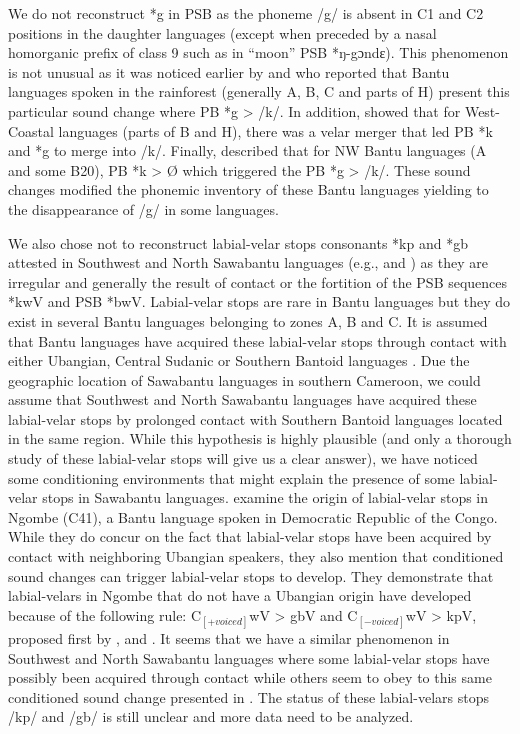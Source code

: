 \documentclass[output=paper,colorlinks,citecolor=brown
]{langscibook}
\begin{document}
We do not reconstruct *g in PSB as the phoneme /g/ is absent in C1 and C2 positions in the daughter languages (except when preceded by a nasal homorganic prefix of class 9 such as in “moon” PSB *ŋ-gɔndɛ). This phenomenon is not unusual as it was noticed earlier by \citet{mohlig1981} and \citet{nurseandphilippson2003} who reported that Bantu languages spoken in the rainforest (generally A, B, C and parts of H) present this particular sound change where PB *g > /k/. In addition, \citet{pacchiarottiandbostoen2020} showed that for West-Coastal languages (parts of B and H), there was a velar merger that led PB *k and *g to merge into /k/. Finally, \citet{grollemundandphilippsonforth2} described that for NW Bantu languages (A and some B20), PB *k > Ø which triggered the PB *g > /k/. These sound changes modified the phonemic inventory of these Bantu languages yielding to the disappearance of /g/ in some languages. 

We also chose not to reconstruct labial-velar stops consonants *kp and *gb attested in Southwest and North Sawabantu languages (e.g.,  and ) as they are irregular and generally the result of contact or the fortition of the PSB sequences *kwV and PSB *bwV. Labial-velar stops are rare in Bantu languages but they do exist in several Bantu languages belonging to zones A, B and C. It is assumed that Bantu languages have acquired these labial-velar stops through contact with either Ubangian, Central Sudanic or Southern Bantoid languages \citep{clementsandrialland2008, bostoenanddonzo2013, idiatovandvandevelde2021}. Due the geographic location of Sawabantu languages in southern Cameroon, we could assume that Southwest and North Sawabantu languages have acquired these labial-velar stops by prolonged contact with Southern Bantoid languages located in the same region. While this hypothesis is highly plausible (and only a thorough study of these labial-velar stops will give us a clear answer), we have noticed some conditioning environments that might explain the presence of some labial-velar stops in Sawabantu languages. \citet[450]{bostoenanddonzo2013} examine the origin of labial-velar stops in Ngombe (C41), a Bantu language spoken in Democratic Republic of the Congo. While they do concur on the fact that labial-velar stops have been acquired by contact with neighboring Ubangian speakers, they also mention that conditioned sound changes can trigger labial-velar stops to develop. They demonstrate that labial-velars in Ngombe that do not have a Ubangian origin have developed because of the following rule: C$_{[+voiced]}$wV > gbV and C$_{[-voiced]}$wV > kpV, proposed first by \citet{Connell1994}, \citet{Connell1998} and \citet{cahill1999}. It seems that we have a similar phenomenon in Southwest and North Sawabantu languages where some labial-velar stops have possibly been acquired through contact while others seem to obey to this same conditioned sound change presented in . The status of these labial-velars stops /kp/ and /gb/ is still unclear and more data need to be analyzed. 
\end{document}
